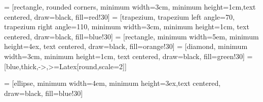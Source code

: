 \usetikzlibrary{shapes.geometric, arrows.meta}
 = [rectangle, rounded corners, minimum width=3cm, minimum height=1cm,text centered, draw=black, fill=red!30]
 = [trapezium, trapezium left angle=70, trapezium right angle=110, minimum width=3cm, minimum height=1cm, text centered, draw=black, fill=blue!30]
 = [rectangle, minimum width=5em, minimum height=4ex, text centered, draw=black, fill=orange!30]
 = [diamond, minimum width=3cm, minimum height=1cm, text centered, draw=black, fill=green!30]
 = [blue,thick,->,>={Latex[round,scale=2]}]


 = [ellipse, minimum width=4em, minimum height=3ex,text centered, draw=black, fill=blue!30]
